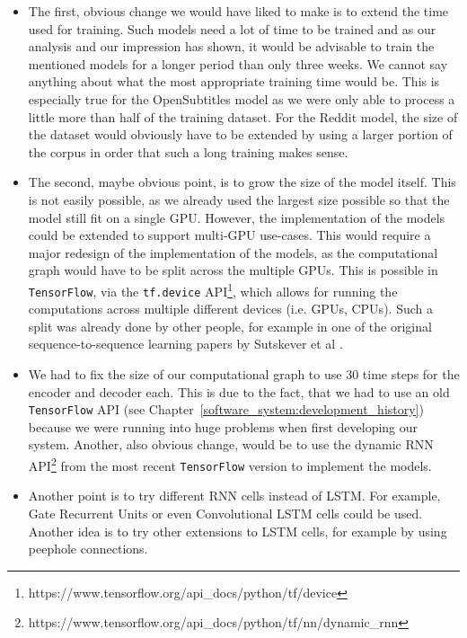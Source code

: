 \begin{itemize}
  \item The first, obvious change we would have liked to make is to extend the time used for training. Such models need a lot of time to be trained and as our analysis and our impression has shown, it would be advisable to train the mentioned models for a longer period than only three weeks. We cannot say anything about what the most appropriate training time would be. This is especially true for the OpenSubtitles model as we were only able to process a little more than half of the training dataset. For the Reddit model, the size of the dataset would obviously have to be extended by using a larger portion of the corpus in order that such a long training makes sense.
  
  \item The second, maybe obvious point, is to grow the size of the model itself. This is not easily possible, as we already used the largest size possible so that the model still fit on a single GPU. However, the implementation of the models could be extended to support multi-GPU use-cases. This would require a major redesign of the implementation of the models, as the computational graph would have to be split across the multiple GPUs. This is possible in \texttt{TensorFlow}, via the \texttt{tf.device} API\footnote{https://www.tensorflow.org/api\_docs/python/tf/device}, which allows for running the computations across multiple different devices (i.e. GPUs, CPUs). Such a split was already done by other people, for example in one of the original sequence-to-sequence learning papers by Sutskever et al \cite{Sutskever:2014}.

  \item We had to fix the size of our computational graph to use 30 time steps for the encoder and decoder each. This is due to the fact, that we had to use an old \texttt{TensorFlow} API (see Chapter~\ref{software_system:development_history}) because we were running into huge problems when first developing our system. Another, also obvious change, would be to use the dynamic RNN API\footnote{https://www.tensorflow.org/api\_docs/python/tf/nn/dynamic\_rnn} from the most recent \texttt{TensorFlow} version to implement the models.
  
  \item Another point is to try different RNN cells instead of LSTM. For example, Gate Recurrent Units \cite{Chung:2014} or even Convolutional LSTM \cite{Xingjian:2015} cells could be used. Another idea is to try other extensions to LSTM cells, for example by using peephole connections.


\end{itemize}
